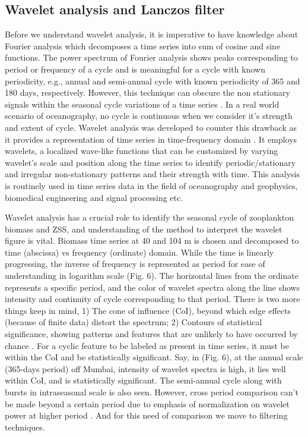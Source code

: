 \documentclass[authoryear,review,12pt]{elsarticle}
\begin{document}
	\subsection{Wavelet analysis and Lanczos filter}
	\label{sec:wavelet_lanczos}
	Before we understand wavelet analysis, it is imperative to have knowledge about Fourier analysis which decomposes a time series into sum of cosine and sine functions. The power spectrum of Fourier analysis shows peaks corresponding to period or frequency of a cycle and is meaningful for a cycle with known periodicity, e.g., annual and semi-annual cycle with known periodicity of 365 and 180 days, respectively. However, this technique can obscure the non stationary signals within the seasonal cycle variations of a time series \citep{amol2014observed,chaudhuri2020observed}. In a real world scenario of oceanography, no cycle is continuous when we consider it's strength and extent of cycle. Wavelet analysis was developed to counter this drawback as it provides a representation of time series in time-frequency domain \citep{torrence1998practical}. It employs wavelets, a localized wave-like functions that can be customized by varying wavelet's scale and position along the time series to identify periodic/stationary and irregular non-stationary patterns and their strength with time. This analysis is routinely used in time series data in the field of oceanography and geophysics, biomedical engineering and signal processing etc.
	
	Wavelet analysis has a crucial role to identify the seasonal cycle of zooplankton biomass and ZSS, and understanding of the method to interpret the wavelet figure is vital. Biomass time series at 40 and 104 m is chosen and decomposed to time (abscissa) vs frequency (ordinate) domain. While the time is linearly progressing, the inverse of frequency is represented as period for ease of understanding in logarithm scale (Fig. 6). The horizontal lines from the ordinate represents a specific period, and the color of wavelet spectra along the line shows intensity and continuity of cycle corresponding to that period. There is two more things keep in mind, 1) The cone of influence (CoI), beyond which edge effects (because of finite data) distort the spectrum; 2) Contours of statistical significance, showing patterns and features that are unlikely to have occurred by chance \citep{torrence1998practical}. For a cyclic feature to be labeled as present in time series, it must be within the CoI and be statistically significant. Say, in (Fig. 6), at the annual scale (365-days period) off Mumbai, intensity of wavelet spectra is high, it lies well within CoI, and is statistically significant. The semi-annual cycle along with bursts in intraseasonal scale is also seen. However, cross period comparison can't be made beyond a certain period due to emphasis of normalization on wavelet power at higher period \citep{maraun2004cross}. And for this need of comparison we move to filtering techniques.
	
\end{document}
